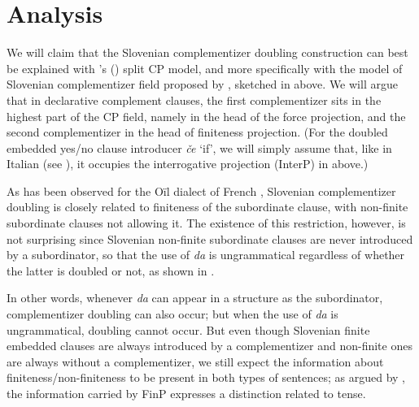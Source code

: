 \documentclass[output=paper,
]{langscibook}
\begin{document}
\section{Analysis}\label{sec:plesnicar:s5}
We will claim that the Slovenian complementizer doubling construction can best be explained with \citeauthor{rizzi1997}'s (\citeyear{rizzi1997, rizzi2001}) split CP model, and more specifically with the model of Slovenian complementizer field proposed by \cite{mismas2015}, sketched in  above. We will argue that in declarative complement clauses, the first complementizer sits in the highest part of the CP field, namely in the head of the force projection, and the second complementizer in the head of finiteness projection. (For the doubled embedded yes/no clause introducer \textit{če} `if', we will simply assume that, like in Italian (see \citealt{rizzi2001}), it occupies the interrogative projection (InterP) in  above.)

As has been observed for the Oïl dialect of French \citep{dagnac2012}, Slovenian complementizer doubling is closely related to finiteness of the subordinate clause, with non-finite subordinate clauses not allowing it. The existence of this restriction, however, is not surprising since Slovenian non-finite subordinate clauses are never introduced by a subordinator, so that the use of \textit{da} is ungrammatical regardless of whether the latter is doubled or not, as shown in . 

\begin{exe} 
\end{exe}

\noindent In other words, whenever \textit{da} can appear in a structure as the subordinator, complementizer doubling can also occur; but when the use of \textit{da} is ungrammatical, doubling cannot occur. But even though Slovenian finite embedded clauses are always introduced by a complementizer and non-finite ones are always without a complementizer, we still expect the information about finiteness/non-finiteness to be present in both types of sentences; as argued by \cite{rizzi1997}, the information carried by FinP expresses a distinction related to tense. 
\end{document}
